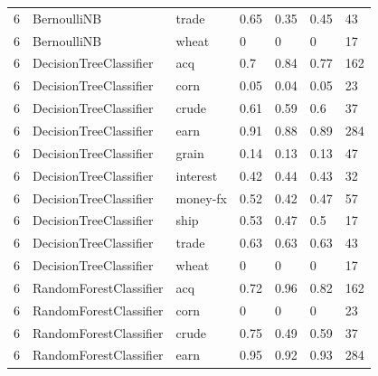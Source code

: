 \documentclass{article}
\begin{document}
\begin{table}[h]
\begin{tabular}{lllllll}
6             & BernoulliNB            & trade           & 0.65               & 0.35            & 0.45              & 43               \\
6             & BernoulliNB            & wheat           & 0                  & 0               & 0                 & 17               \\
6             & DecisionTreeClassifier & acq             & 0.7                & 0.84            & 0.77              & 162              \\
6             & DecisionTreeClassifier & corn            & 0.05               & 0.04            & 0.05              & 23               \\
6             & DecisionTreeClassifier & crude           & 0.61               & 0.59            & 0.6               & 37               \\
6             & DecisionTreeClassifier & earn            & 0.91               & 0.88            & 0.89              & 284              \\
6             & DecisionTreeClassifier & grain           & 0.14               & 0.13            & 0.13              & 47               \\
6             & DecisionTreeClassifier & interest        & 0.42               & 0.44            & 0.43              & 32               \\
6             & DecisionTreeClassifier & money-fx        & 0.52               & 0.42            & 0.47              & 57               \\
6             & DecisionTreeClassifier & ship            & 0.53               & 0.47            & 0.5               & 17               \\
6             & DecisionTreeClassifier & trade           & 0.63               & 0.63            & 0.63              & 43               \\
6             & DecisionTreeClassifier & wheat           & 0                  & 0               & 0                 & 17               \\
6             & RandomForestClassifier & acq             & 0.72               & 0.96            & 0.82              & 162              \\
6             & RandomForestClassifier & corn            & 0                  & 0               & 0                 & 23               \\
6             & RandomForestClassifier & crude           & 0.75               & 0.49            & 0.59              & 37               \\
6             & RandomForestClassifier & earn            & 0.95               & 0.92            & 0.93              & 284              \\\end{tabular}
\end{table}
\end{document}
